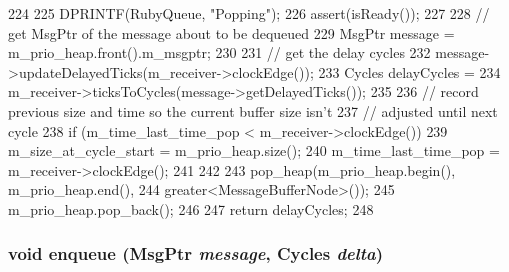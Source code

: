 \begin{DoxyCode}
224 {
225     DPRINTF(RubyQueue, "Popping\n");
226     assert(isReady());
227 
228     // get MsgPtr of the message about to be dequeued
229     MsgPtr message = m_prio_heap.front().m_msgptr;
230 
231     // get the delay cycles
232     message->updateDelayedTicks(m_receiver->clockEdge());
233     Cycles delayCycles =
234         m_receiver->ticksToCycles(message->getDelayedTicks());
235 
236     // record previous size and time so the current buffer size isn't
237     // adjusted until next cycle
238     if (m_time_last_time_pop < m_receiver->clockEdge()) {
239         m_size_at_cycle_start = m_prio_heap.size();
240         m_time_last_time_pop = m_receiver->clockEdge();
241     }
242 
243     pop_heap(m_prio_heap.begin(), m_prio_heap.end(),
244         greater<MessageBufferNode>());
245     m_prio_heap.pop_back();
246 
247     return delayCycles;
248 }
\end{DoxyCode}
\hypertarget{classMessageBuffer_acac1ced7e82669dca7bb95e66ca54fb9}{
\subsubsection[{enqueue}]{\setlength{\rightskip}{0pt plus 5cm}void enqueue ({\bf MsgPtr} {\em message}, \/  {\bf Cycles} {\em delta})}}
\label{classMessageBuffer_acac1ced7e82669dca7bb95e66ca54fb9}




